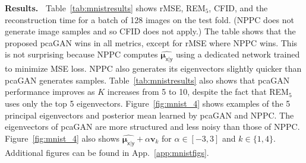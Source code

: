\documentclass{article}
\theoremstyle{plain}
\theoremstyle{definition}
\theoremstyle{remark}
\renewcommand{\hat}{\widehat}
\newcommand{\hvec}[1]{\ensuremath{\Hat{\boldsymbol{#1}}}}
\renewcommand{\vec}[1]{\ensuremath{\boldsymbol{#1}}}
\newcommand{\Figref}[1]{Figure~\ref{fig:#1}}
\newcommand{\tabref}[1]{Table~\ref{tab:#1}}
\newcommand{\appref}[1]{App.~\ref{app:#1}}
\newcommand{\muxgy}{\vec{\mu}_{\mathsf{x}|\mathsf{y}}}
\begin{document}
\newcommand{\mnistFigBody}[2]{
    \begin{figure}[#2]
    \centering
    \begin{subfigure}[b]{.49\columnwidth}
        \caption{pcaGAN ($K=10$)}
        \mnistSubfigBody{#1}{eigengan}
        \label{fig:mnist_pcagan_#1}
    \end{subfigure}
    \begin{subfigure}[b]{.49\columnwidth}
        \caption{NPPC}
        \mnistSubfigBody{#1}{nppc}
        \label{fig:mnist_nppc_#1}
    \end{subfigure}
    \caption{For (a) pcaGAN and (b) NPPC, this figure shows the true image $\vec{x}$, noisy measurements $\vec{y}$, the conditional mean $\hat{\muxgy}$, principal eigenvectors $\{\hvec{v}_k\}$, and two perturbations of $\hat{\muxgy}$.}
    \label{fig:mnist_#1}
\end{figure}
}

\newcommand{\mnistFig}[1]{
    \begin{figure}[h]
    \centering
    \begin{subfigure}[b]{.49\columnwidth}
        \caption{pcaGAN ($K=10$)}
        \mnistSubfig{#1}{eigengan}
        \label{fig:mnist_pcagan_#1}
    \end{subfigure}
    \begin{subfigure}[b]{.49\columnwidth}
        \caption{NPPC}
        \mnistSubfig{#1}{nppc}
        \label{fig:mnist_nppc_#1}
    \end{subfigure}
    \caption{For (a) pcaGAN and (b) NPPC, this figure shows the true image $\vec{x}$, noisy measurements $\vec{y}$, the conditional mean $\hat{\muxgy}$, principal eigenvectors $\{\hvec{v}_k\}$, and two perturbations of $\hat{\muxgy}$.}
    \label{fig:mnist_#1}
\end{figure}
}

\textbf{Results.~}
\tabref{mnistresults} shows rMSE, REM$_5$, CFID, and the reconstruction time for a batch of 128 images on the test fold.
(NPPC does not generate image samples and so CFID does not apply.)
The table shows that the proposed pcaGAN wins in all metrics, except for rMSE where NPPC wins.
This is not surprising because NPPC computes $\hat{\muxgy}$ using a dedicated network trained to minimize MSE loss.
NPPC also generates its eigenvectors slightly quicker than pcaGAN generates samples.
\tabref{mnistresults} also shows that pcaGAN performance improves as $K$ increases from 5 to 10, despite the fact that REM$_5$ uses only the top 5 eigenvectors. \Figref{mnist_4} shows examples of the 5 principal eigenvectors and posterior mean learned by pcaGAN and NPPC.
The eigenvectors of pcaGAN are more structured and less noisy than those of NPPC. 
\Figref{mnist_4} also shows $\hat{\muxgy}\!+\!\alpha\vec{v}_k$ for $\alpha\in[-3,3]$ and $k\in\{1,4\}$.
Additional figures can be found in \appref{mnistfigs}.
\end{document}
